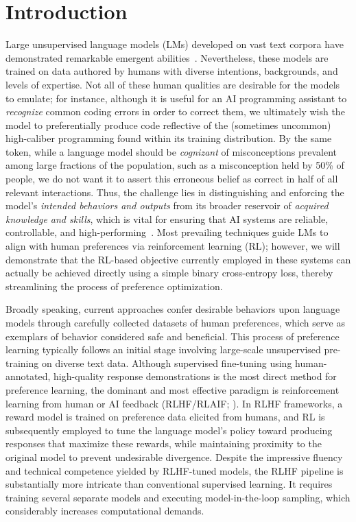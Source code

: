 \section{Introduction}
Large unsupervised language models (LMs) developed on vast text corpora have demonstrated remarkable emergent abilities~\citep{chowdhery2022palm, brown2020language, touvron2023llama,bubeck2023sparks}. Nevertheless, these models are trained on data authored by humans with diverse intentions, backgrounds, and levels of expertise. Not all of these human qualities are desirable for the models to emulate; for instance, although it is useful for an AI programming assistant to \textit{recognize} common coding errors in order to correct them, we ultimately wish the model to preferentially produce code reflective of the (sometimes uncommon) high-caliber programming found within its training distribution. By the same token, while a language model should be \textit{cognizant} of misconceptions prevalent among large fractions of the population, such as a misconception held by 50\% of people, we do not want it to assert this erroneous belief as correct in half of all relevant interactions. Thus, the challenge lies in distinguishing and enforcing the model's \emph{intended behaviors and outputs} from its broader reservoir of \textit{acquired knowledge and skills}, which is vital for ensuring that AI systems are reliable, controllable, and high-performing~\citep{ouyang2022training}. Most prevailing techniques guide LMs to align with human preferences via reinforcement learning (RL); however, we will demonstrate that the RL-based objective currently employed in these systems can actually be achieved directly using a simple binary cross-entropy loss, thereby streamlining the process of preference optimization.

Broadly speaking, current approaches confer desirable behaviors upon language models through carefully collected datasets of human preferences, which serve as exemplars of behavior considered safe and beneficial. This process of preference learning typically follows an initial stage involving large-scale unsupervised pre-training on diverse text data. Although supervised fine-tuning using human-annotated, high-quality response demonstrations is the most direct method for preference learning, the dominant and most effective paradigm is reinforcement learning from human or AI feedback (RLHF/RLAIF; \citep{christiano2017deep,bai2022constitutional}). In RLHF frameworks, a reward model is trained on preference data elicited from humans, and RL is subsequently employed to tune the language model's policy toward producing responses that maximize these rewards, while maintaining proximity to the original model to prevent undesirable divergence. Despite the impressive fluency and technical competence yielded by RLHF-tuned models, the RLHF pipeline is substantially more intricate than conventional supervised learning. It requires training several separate models and executing model-in-the-loop sampling, which considerably increases computational demands.

